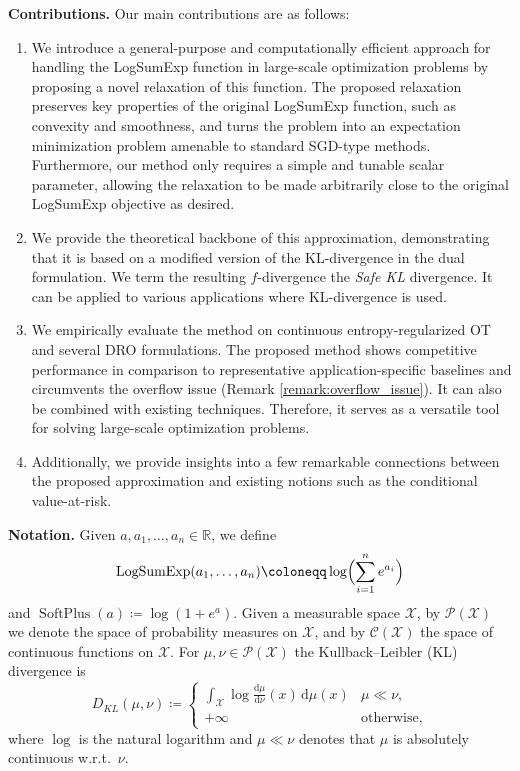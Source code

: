 \documentclass{article}
\newcommand{\dd}{\,\mathrm{d}}
\newcommand{\ddd}{\mathrm{d}}
\newcommand{\Pspace}{\mathcal{P}}
\newcommand{\R}{\mathbb{R}}
\newcommand*{\eqset}{\coloneqq}
\def\cX{\mathcal{X}}
\theoremstyle{plain}
\theoremstyle{definition}
\theoremstyle{remark}
\begin{document}
\textbf{Contributions.} Our main contributions are as follows:
\begin{enumerate}
    \item We introduce a general-purpose and computationally efficient approach for handling the LogSumExp function in large-scale optimization problems by proposing a novel relaxation of this function. The proposed relaxation preserves key properties of the original LogSumExp function, such as convexity and smoothness, and turns the problem into an expectation minimization problem amenable to standard SGD-type methods. 
    Furthermore, our method only requires a simple and tunable scalar parameter, allowing the relaxation to be made arbitrarily close to the original LogSumExp objective as desired.
    
    \item We provide the theoretical backbone of this approximation, demonstrating that it is based on a modified version of the KL-divergence in the dual formulation. We term the resulting $f$-divergence the \emph{Safe KL} divergence.
    It can be applied to various applications where KL-divergence is used.
    
    \item We empirically evaluate the method on continuous entropy-regularized OT and several DRO formulations. The proposed method shows competitive performance in comparison to representative application-specific baselines  
    and circumvents the overflow issue (Remark \ref{remark:overflow_issue}). It can also be combined with existing techniques. Therefore, it serves as a versatile tool for solving large-scale optimization problems.
    \item Additionally, we provide insights into a few remarkable connections between the proposed approximation and existing notions such as the conditional value-at-risk.
\end{enumerate}


\textbf{Notation.}
Given $a, a_1, \dots, a_n \in \R$, we define
\[
    \operatorname{LogSumExp}(a_1, \dots, a_n) \eqset \log \Bigl(\sum_{i=1}^n e^{a_i}\Bigr)
\]
and $\operatorname{SoftPlus}(a) \eqset \log (1 + e^{a})$. 
Given a measurable space $\cX$, by $\Pspace(\cX)$ we denote the space of probability measures on $\cX$, and by $\mathcal{C}(\cX)$ the space of continuous functions on $\cX$. For $\mu, \nu \in \Pspace(\cX)$ the Kullback--Leibler (KL) divergence is
$$
D_{KL}(\mu, \nu) \eqset \begin{cases}
    \int_{\cX} \log \frac{\ddd\mu}{\ddd\nu}(x) \dd\mu(x) & \mu \ll \nu, \\
    +\infty & \text{otherwise},
\end{cases}
$$
where $\log$ is the natural logarithm and $\mu \ll \nu$ denotes that $\mu$ is absolutely continuous w.r.t.\ $\nu$. 
\end{document}
